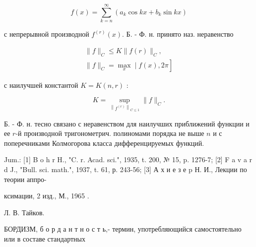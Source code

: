 \documentclass[10pt]{article}
\begin{document}
\[

f(x)=\sum_{k=n}^{\infty}\left(a_{k} \cos k x+b_{k} \sin k x\right)

\]



с непрерывной производной $f^{(r)}(x)$. Б. - Ф. н. принято наз. неравенство



\[

\begin{gathered}

\|f\|_{C} \leqslant K\|f(r)\|_{C}, \\

\left.\|f\|_{C}=\max _{x} \mid f(x), 2 \pi\right]

\end{gathered}

\]



с наилучшей константой $K=K(n, r)$ :



\[

K=\sup _{\left\|f^{(r)}\right\|_{C \leqslant 1}}\|f\|_{C} .

\]



Б. - Ф. н. тесно связано с неравенством для наилучших приближений функции и ее $r$-й производной тригонометрич. полиномами порядка не выше $n$ и с поперечниками Колмогорова класса дифференцируемых функций.



Jum.: [1] B o h r H., "C. r. Acad. sci.", 1935, t. 200, № 15, p. 1276-7; [2] F a v a r d J., "Bull. sci. math.", 1937, t. 61, р. 243-56; [3] А х и е з е p Н. И., Лекции по теории аппро-

ксимации, 2 изд., М., 1965 .

Л. В. Тайков.



БОРДИЗМ, б о р д а н т н о с т ь,- термин, употребляющийся самостоятельно или в составе стандартных
\end{document}
